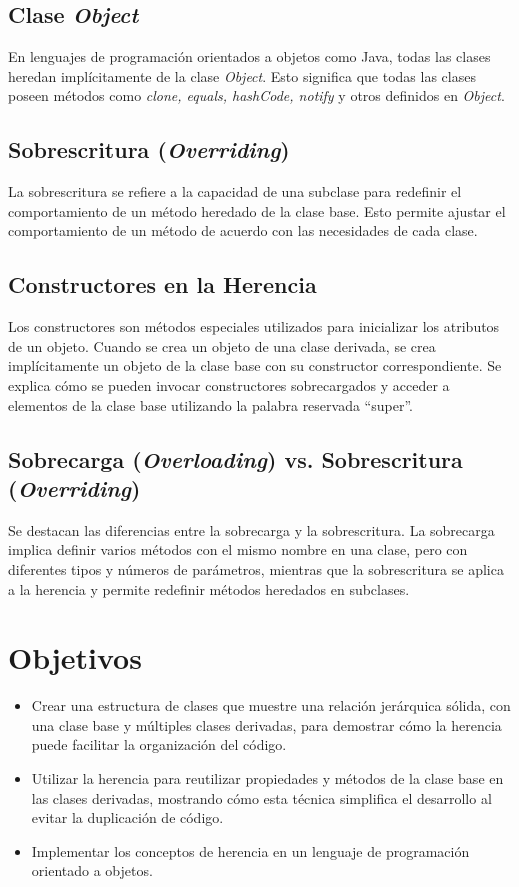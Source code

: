 \documentclass[11pt, twocolumn]{article}
\begin{document}
  \subsection*{Clase \textit{Object}}
  En lenguajes de programación orientados a objetos como Java, todas las clases heredan implícitamente de la clase \textit{Object}. Esto significa que todas las clases poseen métodos como \textit{clone, equals, hashCode, notify} y otros definidos en \textit{Object}.

  \subsection*{Sobrescritura (\textit{Overriding})}
  La sobrescritura se refiere a la capacidad de una subclase para redefinir el comportamiento de un método heredado de la clase base. Esto permite ajustar el comportamiento de un método de acuerdo con las necesidades de cada clase.

  \subsection*{Constructores en la Herencia}
  Los constructores son métodos especiales utilizados para inicializar los atributos de un objeto. Cuando se crea un objeto de una clase derivada, se crea implícitamente un objeto de la clase base con su constructor correspondiente. Se explica cómo se pueden invocar constructores sobrecargados y acceder a elementos de la clase base utilizando la palabra reservada ``super''.

  \subsection*{Sobrecarga (\textit{Overloading}) vs. Sobrescritura (\textit{Overriding})}
  Se destacan las diferencias entre la sobrecarga y la sobrescritura. La sobrecarga implica definir varios métodos con el mismo nombre en una clase, pero con diferentes tipos y números de parámetros, mientras que la sobrescritura se aplica a la herencia y permite redefinir métodos heredados en subclases.

  \section*{Objetivos}
  \begin{itemize}
    \item Crear una estructura de clases que muestre una relación jerárquica sólida, con una clase base y múltiples clases derivadas, para demostrar cómo la herencia puede facilitar la organización del código.
    \item Utilizar la herencia para reutilizar propiedades y métodos de la clase base en las clases derivadas, mostrando cómo esta técnica simplifica el desarrollo al evitar la duplicación de código.
    \item Implementar los conceptos de herencia en un lenguaje de programación orientado a objetos.
  \end{itemize}
\end{document}
